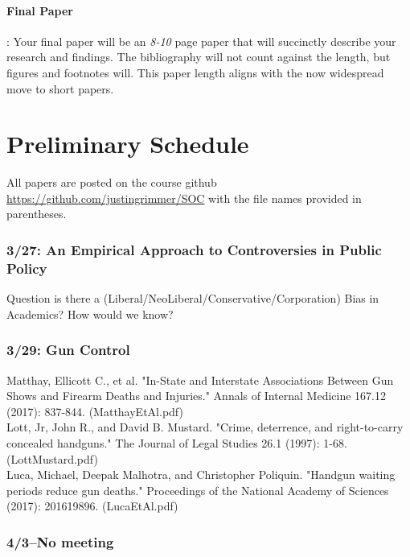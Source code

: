 \documentclass[12pt,letterpaper]{article}
\numberwithin{equation}{section}
\begin{document}
\paragraph{Final Paper}: Your final paper will be an \emph{8-10} page paper that will succinctly describe your research and findings.  The bibliography will not count against the length, but figures and footnotes will.  This paper length aligns with the now widespread move to short papers. 


\section{Preliminary Schedule}

All papers are posted on the course github \url{https://github.com/justingrimmer/SOC} with the file names provided in parentheses.  



\subsubsection{3/27: An Empirical Approach to Controversies in Public Policy}

Question is there a (Liberal/NeoLiberal/Conservative/Corporation) Bias in Academics?
How would we know?

\subsubsection{3/29: Gun Control }
\noindent Matthay, Ellicott C., et al. "In-State and Interstate Associations Between Gun Shows and Firearm Deaths and Injuries." Annals of Internal Medicine 167.12 (2017): 837-844. (MatthayEtAl.pdf) \\


\noindent Lott, Jr, John R., and David B. Mustard. "Crime, deterrence, and right-to-carry concealed handguns." The Journal of Legal Studies 26.1 (1997): 1-68.
(LottMustard.pdf) \\


\noindent Luca, Michael, Deepak Malhotra, and Christopher Poliquin. "Handgun waiting periods reduce gun deaths." Proceedings of the National Academy of Sciences (2017): 201619896. (LucaEtAl.pdf) \\


\subsubsection{4/3--No meeting}
\end{document}
